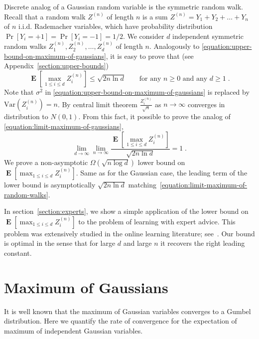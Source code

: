 \documentclass{article}
\DeclareMathOperator*{\Exp}{\mathbf{E}}
\newcommand{\Var}{\mathrm{Var}}
\begin{document}
Discrete analog of a Gaussian random variable is the symmetric random walk. Recall that a random walk $Z^{(n)}$
of length $n$ is a sum $Z^{(n)} = Y_1 + Y_2 + \dots + Y_n$ of $n$ i.i.d. Rademacher variables, which have probability distribution
$\Pr[Y_i = +1] = \Pr[Y_i = -1] = 1/2$. We consider $d$ independent symmetric random walks $Z^{(n)}_1, Z^{(n)}_2, \dots, Z^{(n)}_d$ of length $n$.
Analogously to \eqref{equation:upper-bound-on-maximum-of-gaussians}, it is easy to prove that (see Appendix~\ref{section:upper-bounds})
\begin{equation}
\label{equation:upper-bound-on-maximum-of-random-walks}
\Exp \left[ \max_{1 \le i \le d} Z^{(n)}_i \right] \le \sqrt{2 n \ln d} \qquad \text{for any $n \ge 0$ and any $d \ge 1$}\; .
\end{equation}
Note that $\sigma^2$ in \eqref{equation:upper-bound-on-maximum-of-gaussians} is replaced by $\Var(Z^{(n)}_i) = n$. By central limit theorem $\frac{Z^{(n)}_i}{\sqrt{n}}$
as $n \to \infty$ converges in distribution to $N(0,1)$. From this fact, it possible to prove
the analog of \eqref{equation:limit-maximum-of-gaussians},
\begin{equation}
\label{equation:limit-maximum-of-random-walks}
\lim_{d \to \infty} \lim_{n \to \infty} \frac{\Exp\left[ \max_{1 \le i \le d} Z^{(n)}_i \right]}{\sqrt{2 n \ln d}} = 1 \; .
\end{equation}
We prove a non-asymptotic $\Omega(\sqrt{n \log d})$ lower bound on $\Exp\left[ \max_{1 \le i \le d} Z^{(n)}_i \right]$.
Same as for the Gaussian case, the leading term of the lower bound is asymptotically $\sqrt{2 n \ln d}$
matching~\eqref{equation:limit-maximum-of-random-walks}.

In section~\ref{section:experts}, we show a simple application of the lower
bound on $\Exp\left[\max_{1 \le i \le d} Z^{(n)}_i \right]$ to the problem of learning with
expert advice.  This problem was extensively studied in the online learning
literature; see~\citep{Cesa-BianchiL06}.  Our bound is optimal in the sense
that for large $d$ and large $n$ it recovers the right leading constant.

\section{Maximum of Gaussians}
\label{section:maximum-of-gaussians}

It is well known that the maximum of Gaussian variables converges to a Gumbel
distribution. Here we quantify the rate of convergence for the expectation of
maximum of independent Gaussian variables.
\end{document}

